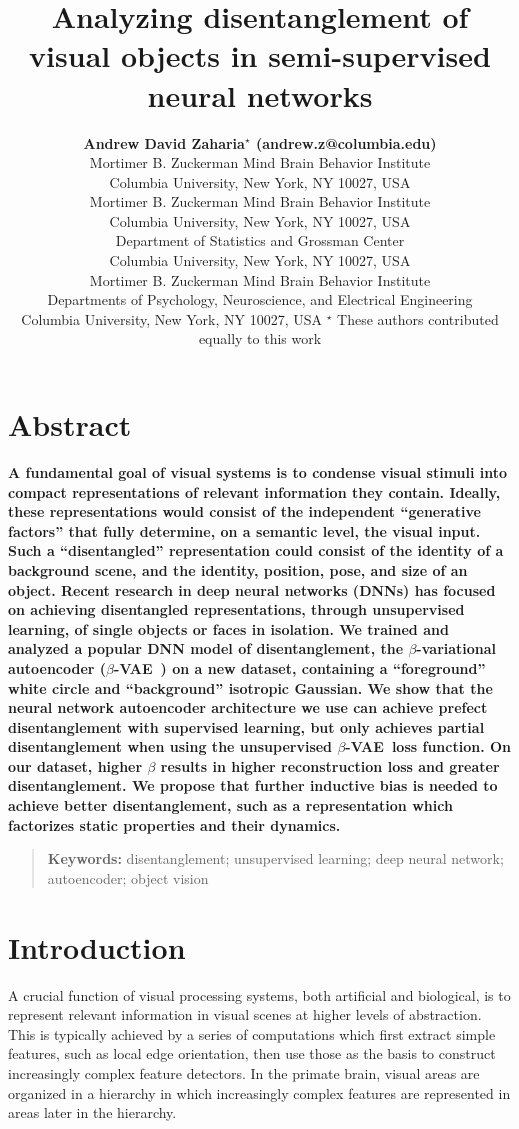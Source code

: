 \documentclass[10pt,letterpaper]{article}
\title{Analyzing disentanglement of visual objects in semi-supervised neural networks}
\author{{\large \bf Andrew David Zaharia$^\star$ (andrew.z@columbia.edu)} \\
  Mortimer B. Zuckerman Mind Brain Behavior Institute\\
  Columbia University, New York, NY 10027, USA
  \AND {\large \bf Benjamin Peters$^\star$ (benjamin.peters@columbia.edu)} \\
  Mortimer B. Zuckerman Mind Brain Behavior Institute\\
  Columbia University, New York, NY 10027, USA
  \AND {\large \bf John Cunningham (jpc2181@columbia.edu)} \\
  Department of Statistics and Grossman Center\\
  Columbia University, New York, NY 10027, USA
  \AND {\large \bf Nikolaus Kriegeskorte (n.kriegeskorte@columbia.edu)} \\
  Mortimer B. Zuckerman Mind Brain Behavior Institute\\ Departments of Psychology, Neuroscience, and Electrical Engineering\\
  Columbia University, New York, NY 10027, USA
  \AND $^\star$ These authors contributed equally to this work}
\newcommand{\bvae}{$\beta$-VAE~}
\begin{document}
\maketitle

\section{Abstract}
{
\bf
A fundamental goal of visual systems is to condense visual stimuli into compact representations of relevant information they contain. Ideally, these representations would consist of the independent ``generative factors'' that fully determine, on a semantic level, the visual input. Such a ``disentangled'' representation could consist of the identity of a background scene, and the identity, position, pose, and size of an object. Recent research in deep neural networks (DNNs) has focused on achieving disentangled representations, through unsupervised learning, of single objects or faces in isolation. We trained and analyzed a popular DNN model of disentanglement, the $\beta$-variational autoencoder (\bvae) on a new dataset, containing a ``foreground'' white circle and ``background'' isotropic Gaussian. We show that the neural network autoencoder architecture we use can achieve prefect disentanglement with supervised learning, but only achieves partial disentanglement when using the unsupervised \bvae loss function. On our dataset, higher $\beta$ results in higher reconstruction loss and greater disentanglement. We propose that further inductive bias is needed to achieve better disentanglement, such as a representation which factorizes static properties and their dynamics.
}
\begin{quote}
\small
\textbf{Keywords:} 
disentanglement; unsupervised learning; deep neural network; autoencoder; object vision
\end{quote}


\section{Introduction}

A crucial function of visual processing systems, both artificial and biological, is to represent relevant information in visual scenes at higher levels of abstraction. This is typically achieved by a series of computations which first extract simple features, such as local edge orientation, then use those as the basis to construct increasingly complex feature detectors. In the primate brain, visual areas are organized in a hierarchy in which increasingly complex features are represented in areas later in the hierarchy.
\end{document}
